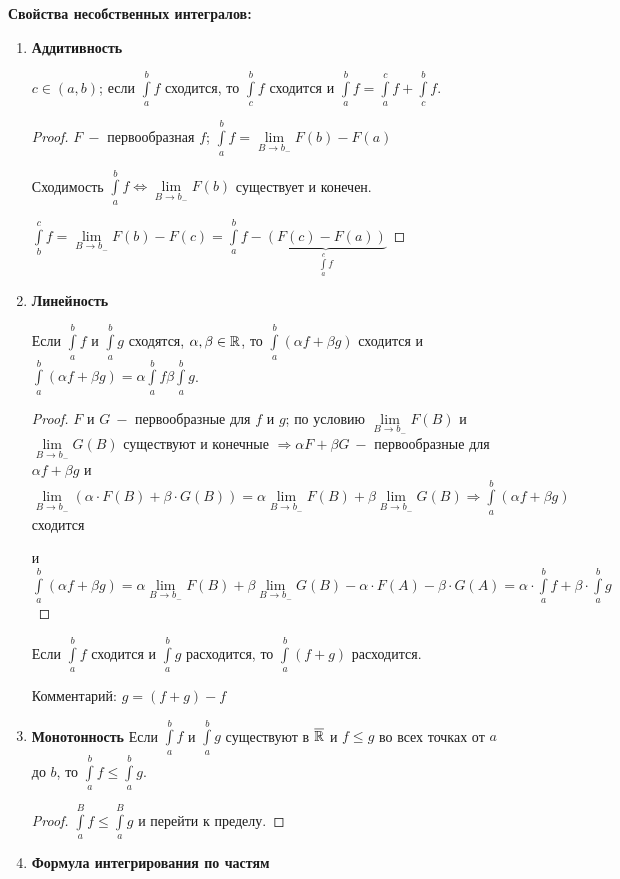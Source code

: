 \begin{statement}
    \textbf{Свойства несобственных интегралов:}
    \begin{enumerate}
        \item \textbf{Аддитивность}

        $c\in (a,b)$; если $\int\limits_a^b f$ сходится, то $\int\limits_c^b f$ сходится и $\int\limits_a^b f=\int\limits_a^c f+\int\limits_c^b f$.

        \begin{proof}
            $F\ -$ первообразная $f$; $\int\limits_a^b f = \lim\limits_{B\rightarrow b_-}F(b)-F(a)$

            Сходимость $\int\limits_a^b f\Leftrightarrow \lim\limits_{B\rightarrow b_-}F(b)$ существует и конечен.

            $\int\limits_b^c f=\lim\limits_{B\rightarrow b_-}F(b)-F(c)=\int\limits_a^b f - \underbrace{(F(c)-F(a))}_{\int\limits_a^c f}$
        \end{proof}
        \item \textbf{Линейность}

        Если $\int\limits_a^b f$ и $\int\limits_a^b g$ сходятся, $\alpha, \beta\in \mathbb{R}$, то $\int\limits_a^b(\alpha f+\beta g)$ сходится и $\int\limits_a^b(\alpha f+\beta g)=\alpha\int\limits_a^b f\beta \int\limits_a^b g$.
        \begin{proof}
            $F$ и $G\ -$ первообразные для $f$ и $g$; по условию $\lim\limits_{B\rightarrow b_-} F(B)$ и $\lim\limits_{B\rightarrow b_-} G(B)$ существуют и конечные $\Rightarrow\alpha F + \beta G\ -$ первообразные для $\alpha f + \beta g$ и $\lim\limits_{B\rightarrow b_-}(\alpha\cdot F(B) + \beta\cdot G(B))=\alpha\lim\limits_{B\rightarrow b_-}F(B) + \beta\lim\limits_{B\rightarrow b_-} G(B)\Rightarrow \int\limits_a^b (\alpha f + \beta g)$ сходится 
            
            и $\int\limits_a^b (\alpha f + \beta g)=\alpha\lim\limits_{B\rightarrow b_-}F(B) + \beta\lim\limits_{B\rightarrow b_-} G(B)-\alpha \cdot F(A) - \beta \cdot G(A)=\alpha \cdot \int\limits_a^b f+\beta \cdot \int\limits_a^b g$  
        \end{proof}
        \begin{remark}
            Если $\int\limits_a^b f$ сходится и $\int\limits_a^b g$ расходится, то $\int\limits_a^b(f+g)$ расходится.
        \end{remark}

        Комментарий: $g=(f+g)-f$
        \item \textbf{Монотонность}
        Если $\int\limits_a^b f$ и $\int\limits_a^b g$ существуют в $\overline{\mathbb{R}}$ и $f\leq g$ во всех точках от $a$ до $b$, то $\int\limits_a^b f \leq \int\limits_a^b g$.
        \begin{proof}
            $\int\limits_a^B f\leq \int\limits_a^B g$ и перейти к пределу.
        \end{proof}
        \item \textbf{Формула интегрирования по частям}


\end{enumerate}
\end{statement}
